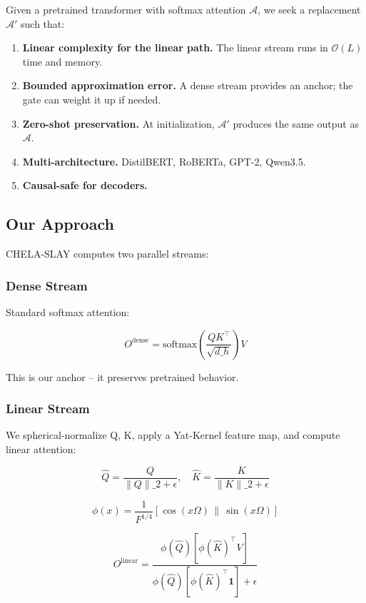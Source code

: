 Given a pretrained transformer with softmax attention $\mathcal{A}$, we seek 
a replacement $\mathcal{A}'$ such that:

\begin{enumerate}
\item \textbf{Linear complexity for the linear path.} The linear stream runs in
  $\mathcal{O}(L)$ time and memory.
\item \textbf{Bounded approximation error.} A dense stream provides an anchor; the
  gate can weight it up if needed.
\item \textbf{Zero-shot preservation.} At initialization, $\mathcal{A}'$ produces
  the same output as $\mathcal{A}$.
\item \textbf{Multi-architecture.} DistilBERT, RoBERTa, GPT-2, Qwen3.5.
\item \textbf{Causal-safe for decoders.}

\end{enumerate}
\subsection{Our Approach}

CHELA-SLAY computes two parallel streams:

\subsubsection{Dense Stream}

Standard softmax attention:

\[
O^\text{dense} = \text{softmax}\!\left(\frac{Q K^\top}{\sqrt{d\_h}}\right) V
\]

This is our anchor -- it preserves pretrained behavior.

\subsubsection{Linear Stream}

We spherical-normalize Q, K, apply a Yat-Kernel feature map, and compute 
linear attention:

\[
\hat{Q} = \frac{Q}{\|Q\|\_2 + \epsilon}, \quad
\hat{K} = \frac{K}{\|K\|\_2 + \epsilon}
\]

\[
\phi(x) = \frac{1}{F^{1/4}} [\cos(x \Omega) \,\|\, \sin(x \Omega)]
\]

\[
O^\text{linear} = \frac{\phi(\hat{Q}) \left[ \phi(\hat{K})^\top V \right]}{\phi(\hat{Q}) \left[ \phi(\hat{K})^\top \mathbf{1} \right] + \epsilon}
\]

